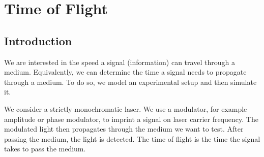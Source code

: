 \documentclass[12pt,a4paper,twoside,openright,BCOR10mm,headsepline,titlepage,abstracton,chapterprefix,final]{scrreprt}
\begin{document}
\section{Time of Flight}
\subsection{Introduction}
We are interested in the speed a signal (information) can travel through a medium.
Equivalently, we can determine the time a signal needs to propagate through a medium.
To do so, we model an experimental setup and then simulate it.

We consider a strictly monochromatic laser. 
We use a modulator, for example amplitude or phase modulator, 
to imprint a signal on laser carrier frequency.
The modulated light then propagates through the medium we want to test.
After passing the medium, the light is detected.
The time of flight is the time the signal takes to pass the medium.
\end{document}
